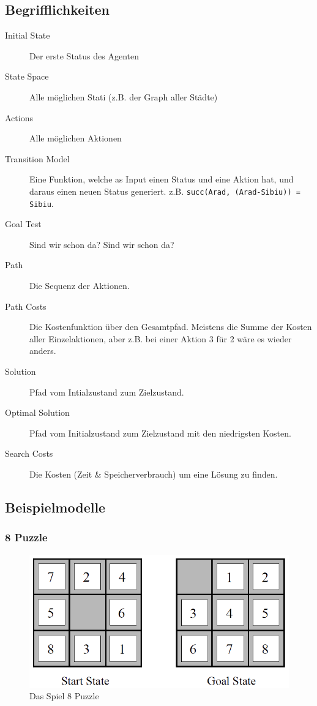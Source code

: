 \subsection{Begrifflichkeiten}
\begin{description}
	\item[Initial State] Der erste Status des Agenten
	\item[State Space] Alle möglichen Stati (z.B. der Graph aller Städte)
	\item[Actions] Alle möglichen Aktionen
	\item[Transition Model] Eine Funktion, welche as Input einen Status und eine Aktion hat, und daraus einen neuen Status generiert. z.B. \texttt{succ(Arad, (Arad-Sibiu)) = Sibiu}.
	\item[Goal Test] Sind wir schon da? Sind wir schon da?
	\item[Path] Die Sequenz der Aktionen.
	\item[Path Costs] Die Kostenfunktion über den Gesamtpfad. Meistens die Summe der Kosten aller Einzelaktionen, aber z.B. bei einer Aktion 3 für 2 wäre es wieder anders.
	\item[Solution] Pfad vom Intialzustand zum Zielzustand.
	\item[Optimal Solution] Pfad vom Initialzustand zum Zielzustand mit den niedrigsten Kosten.
	\item[Search Costs] Die Kosten (Zeit \& Speicherverbrauch) um eine Lösung zu finden.
\end{description}

\subsection{Beispielmodelle}
\subsubsection{8 Puzzle}
\begin{figure}[h!]
\centering
\includegraphics[width=0.6\linewidth]{fig/8_puzzle}
\caption{Das Spiel 8 Puzzle}
\label{fig:8puzzle}
\end{figure}

